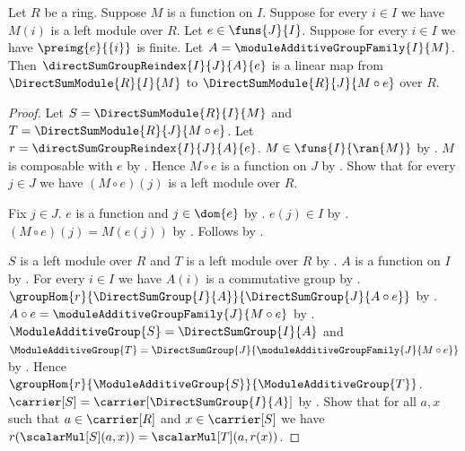 \begin{theorem}\label{direct_sum_module_reindex_linear}
    Let $R$ be a ring.
    Suppose $M$ is a function on $I$.
    Suppose for every $i\in I$ we have $M(i)$ is a left module over $R$.
    Let $e\in\funs{J}{I}$.
    Suppose for every $i\in I$ we have $\preimg{e}{\{i\}}$ is finite.
    Let $A=\moduleAdditiveGroupFamily{I}{M}$.
    Then $\directSumGroupReindex{I}{J}{A}{e}$ is a linear map from
        $\DirectSumModule{R}{I}{M}$ to
        $\DirectSumModule{R}{J}{M\circ e}$ over $R$.
\end{theorem}
\begin{proof}
    Let $S=\DirectSumModule{R}{I}{M}$ and
        $T=\DirectSumModule{R}{J}{M\circ e}$.
    Let $r=\directSumGroupReindex{I}{J}{A}{e}$.
    $M\in\funs{I}{\ran{M}}$ by
        .
    $M$ is composable with $e$ by .
    Hence $M\circ e$ is a function on $J$ by
        .
    Show that for every $j\in J$ we have
        $(M\circ e)(j)$ is a left module over $R$.
    \begin{subproof}
        Fix $j\in J$.
        $e$ is a function and $j\in\dom{e}$ by
            .
        $e(j)\in I$ by .
        $(M\circ e)(j)=M(e(j))$ by
            .
        Follows by \auto.
    \end{subproof}
    $S$ is a left module over $R$ and
        $T$ is a left module over $R$ by
        .
    $A$ is a function on $I$ by
        .
    For every $i\in I$ we have $A(i)$ is a commutative group by
        .
    $\groupHom{r}{\DirectSumGroup{I}{A}}{
        \DirectSumGroup{J}{A\circ e}}$ by
        .
    $A\circ e=\moduleAdditiveGroupFamily{J}{M\circ e}$ by
        .
    $\ModuleAdditiveGroup{S}=\DirectSumGroup{I}{A}$ and
        $\ModuleAdditiveGroup{T}
            =\DirectSumGroup{J}{\moduleAdditiveGroupFamily{J}{M\circ e}}$
        by .
    Hence $\groupHom{r}{\ModuleAdditiveGroup{S}}{
        \ModuleAdditiveGroup{T}}$.
    $\carrier[S]=\carrier[\DirectSumGroup{I}{A}]$ by
        .
    Show that for all $a,x$ such that $a\in\carrier[R]$ and
        $x\in\carrier[S]$ we have
        $r(\scalarMul[S](a,x))=\scalarMul[T](a,r(x))$.

\end{proof}
